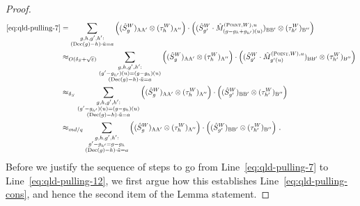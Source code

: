 \documentclass[11pt]{article}
\theoremstyle{definition}
\newcommand{\eps}{\varepsilon}
\newcommand{\labelstyle}[1]{\ensuremath{\textsc{#1}}\xspace}
\newcommand{\alice}{\labelstyle{A}}
\newcommand{\bob}{\labelstyle{B}}
\newcommand{\typestyle}[1]{\ensuremath{\textsc{#1}}\xspace}
\newcommand{\Point}{\typestyle{Point}}
\newcommand{\coded}{\mathrm{Dec}}
\begin{document}
\begin{proof}
\begin{align}
		\text{\eqref{eq:qld-pulling-7}} &=\sum_{\substack{g,h,g',h': \\ (\coded(g)-h)\cdot \tilde{u} = a}} \Big((\hat{S}^W_g)_{\alice \alice'} \otimes (\tau_h^W)_{\alice''} \Big) \cdot \Big( (\hat{S}^W_{g'} \cdot \hat{M}^{(\Point,W),u}_{(g-g_h+g_{h'})(u)})_{\bob \bob'} \otimes (\tau_{h'}^W)_{\bob''} \Big) \label{eq:qld-pulling-9a} \\
		&\approx_{O(\delta_S + \sqrt{\eps})} \sum_{\substack{g,h,g',h': \\ (g' - g_{h'})(u) = (g -g_h)(u) \\ (\coded(g)-h)\cdot \tilde{u} = a}} \Big((\hat{S}^W_g)_{\alice \alice'} \otimes (\tau_h^W)_{\alice''} \Big) \cdot \Big( (\hat{S}^W_{g'} \cdot \hat{M}^{(\Point,W),u}_{g'(u)})_{\bob \bob'} \otimes (\tau_{h'}^W)_{\bob''} \Big) \label{eq:qld-pulling-10} \\
		&\approx_{\delta_S} \sum_{\substack{g,h,g',h': \\ (g' - g_{h'})(u) = (g -g_h)(u) \\ (\coded(g)-h)\cdot \tilde{u} = a}} \Big((\hat{S}^W_g)_{\alice \alice'} \otimes (\tau_h^W)_{\alice''} \Big) \cdot \Big( (\hat{S}^W_{g'})_{\bob \bob'} \otimes (\tau_{h'}^W)_{\bob''} \Big) \label{eq:qld-pulling-11} \\
		&\approx_{md/q} \sum_{\substack{g,h,g',h': \\ g' - g_{h'} = g -g_h \\ (\coded(g)-h)\cdot \tilde{u} = a}} \Big((\hat{S}^W_g)_{\alice \alice'} \otimes (\tau_h^W)_{\alice''} \Big) \cdot \Big( (\hat{S}^W_{g'})_{\bob \bob'} \otimes (\tau_{h'}^W)_{\bob''} \Big)~. \label{eq:qld-pulling-12}
		\end{align}
		Before we justify the sequence of steps to go from Line~\eqref{eq:qld-pulling-7} to Line~\eqref{eq:qld-pulling-12}, we first argue how this establishes Line~\eqref{eq:qld-pulling-cons}, and hence the second item of the Lemma statement.
		

\end{proof}
\end{document}
